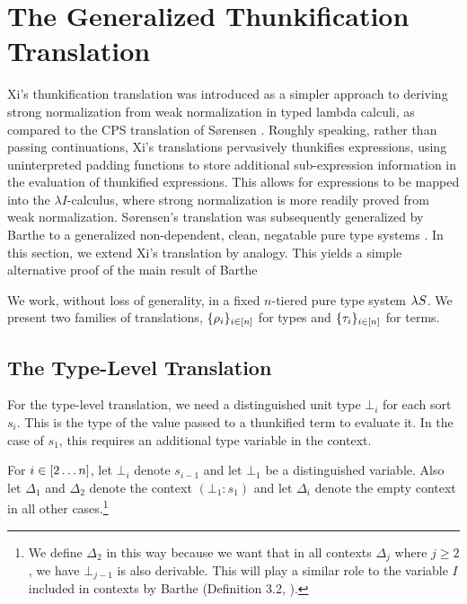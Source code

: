 \documentclass{article}
\begin{document}
\section{The Generalized Thunkification Translation}

Xi's thunkification translation \cite{xi-1997} was introduced as a simpler approach to deriving strong normalization from weak normalization in typed lambda calculi, as compared to the CPS translation of S{\o}rensen \cite{sorensen-1997}.
Roughly speaking, rather than passing continuations, Xi's translations pervasively thunkifies expressions, using uninterpreted padding functions to store additional sub-expression information in the evaluation of thunkified expressions.
This allows for expressions to be mapped into the $\lambda I$-calculus, where strong normalization is more readily proved from weak normalization.
S{\o}rensen's translation was subsequently generalized by Barthe \etal to a generalized non-dependent, clean, negatable pure type systems \cite{barthe-et-al-2001}.
In this section, we extend Xi's translation by analogy.
This yields a simple alternative proof of the main result of Barthe \etal

We work, without loss of generality, in a fixed $n$-tiered pure type system $\lambda S$.
We present two families of translations, $\{\rho_i\}_{i \in [n]}$ for types and $\{\tau_i\}_{i \in [n]}$ for terms.

\subsection{The Type-Level Translation}

For the type-level translation, we need a distinguished unit type $\bot_i$ for each sort $s_i$.
This is the type of the value passed to a thunkified term to evaluate it.
In the case of $s_1$, this requires an additional type variable in the context.

\begin{definition}
For $i \in [2\dots n]$, let $\bot_i$ denote $s_{i - 1}$ and let $\bot_1$ be a distinguished variable.
Also let $\Delta_1$ and $\Delta_2$ denote the context $(\bot_1 : s_1)$ and let $\Delta_i$ denote the empty context in all other cases.\footnote{We define $\Delta_2$ in this way because we want that in all contexts $\Delta_j$ where $j \geq 2$, we have $\bot_{j - 1}$ is also derivable. This will play a similar role to the variable $I$ included in contexts by Barthe \etal (Definition 3.2, \cite{barthe-et-al-2001}).}
\end{definition}
\end{document}
